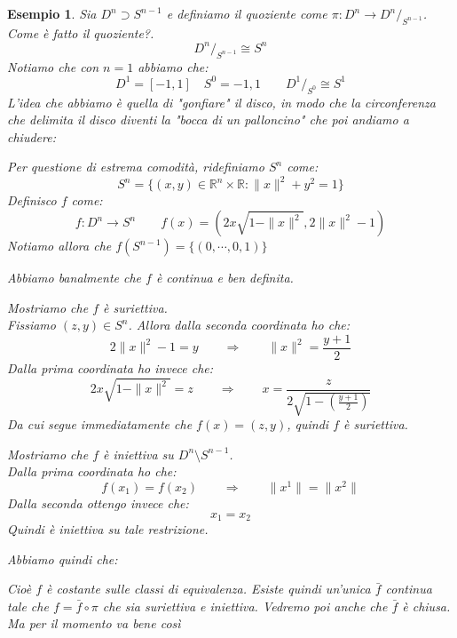 \documentclass[11pt,a4paper,twoside]{article}
\newtheorem{es}{Esempio}
\theoremstyle{definition}
\begin{document}
\begin{es}\label{sndn}
	Sia $D^n \supset S^{n-1}$ e definiamo il quoziente come $\pi:D^n \to D^n/_{S^{n-1}}$. Come è fatto il quoziente?.\[ D^n/_{S^{n-1}} \cong S^n\]
	Notiamo che con $n = 1$ abbiamo che:
	\[ D^1 = [-1,1]\quad S^0 = {-1,1}\qquad D^1/_{S^0} \cong S^1 \]
	L'idea che abbiamo è quella di "gonfiare" il disco, in modo che la circonferenza che delimita il disco diventi la "bocca di un palloncino" che poi andiamo a chiudere:
	\begin{center}
	\end{center}
	Per questione di estrema comodità, ridefiniamo $S^n$ come:
	\[S^n = \{(x,y) \in \mathbb R^n \times \mathbb R: \|x\|^2 + y^2 = 1\}\]
	Definisco $f$ come:
	\[ f:D^n \to S^n \qquad f(x) = \left( 2x \sqrt{1 -\|x\|^2}, 2\|x\|^2 -1 \right) \]
	Notiamo allora che $f(S^{n-1}) = \{(0,\cdots,0,1)\}$

	Abbiamo banalmente che $f$ è continua e ben definita.

	Mostriamo che $f$ è suriettiva.\\
	Fissiamo $(z,y) \in S^n$. Allora dalla seconda coordinata ho che:
	\[ 2\|x\|^2 -1= y\qquad \Rightarrow \qquad \|x\|^2 = \frac{y+1}2 \]
	Dalla prima coordinata ho invece che:
	\[2x\sqrt{1-\|x\|^2} = z \qquad \Rightarrow \qquad x = \frac{z}{2 \displaystyle{\sqrt{1 - \left( \frac{y+1}2 \right)}}}\]
	Da cui segue immediatamente che $f(x) = (z,y)$, quindi $f$ è suriettiva.

	Mostriamo che $f$ è iniettiva su $D^n\setminus S^{n-1}$.\\
	Dalla prima coordinata ho che:
	\[ f(x_1) = f(x_2) \qquad \Rightarrow \qquad \|x^1\| = \|x^2\|\]
	Dalla seconda ottengo invece che:
	\[ x_1 = x_2 \]
	Quindi è iniettiva su tale restrizione.

	Abbiamo quindi che:
	\begin{center}
	\end{center}
	Cioè $f$ è costante sulle classi di equivalenza. Esiste quindi un'unica $\bar f$ continua tale che $f = \bar f \circ \pi$ che sia suriettiva e iniettiva. Vedremo poi anche che $\bar f$ è chiusa. Ma per il momento va bene così
\end{es}
\end{document}

